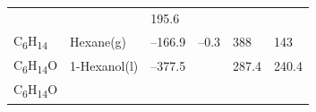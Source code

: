 \documentclass[
  9pt,
]{extbook}
\theoremstyle{definition}
\theoremstyle{definition}
\theoremstyle{definition}
\theoremstyle{remark}
\begin{document}
\begin{longtable}[]{@{}llllll@{}}
\begin{minipage}[t]{0.15\columnwidth}
\strut
\end{minipage} & \begin{minipage}[t]{0.14\columnwidth}\raggedright
\strut
\end{minipage} & \begin{minipage}[t]{0.14\columnwidth}\raggedright
195.6\strut
\end{minipage}\tabularnewline
\begin{minipage}[t]{0.07\columnwidth}\raggedright
C\textsubscript{6}H\textsubscript{14}\strut
\end{minipage} & \begin{minipage}[t]{0.17\columnwidth}\raggedright
Hexane(g)\strut
\end{minipage} & \begin{minipage}[t]{0.15\columnwidth}\raggedright
--166.9\strut
\end{minipage} & \begin{minipage}[t]{0.15\columnwidth}\raggedright
--0.3\strut
\end{minipage} & \begin{minipage}[t]{0.14\columnwidth}\raggedright
388\strut
\end{minipage} & \begin{minipage}[t]{0.14\columnwidth}\raggedright
143\strut
\end{minipage}\tabularnewline
\begin{minipage}[t]{0.07\columnwidth}\raggedright
C\textsubscript{6}H\textsubscript{14}O\strut
\end{minipage} & \begin{minipage}[t]{0.17\columnwidth}\raggedright
1-Hexanol(l)\strut
\end{minipage} & \begin{minipage}[t]{0.15\columnwidth}\raggedright
--377.5\strut
\end{minipage} & \begin{minipage}[t]{0.15\columnwidth}\raggedright
\strut
\end{minipage} & \begin{minipage}[t]{0.14\columnwidth}\raggedright
287.4\strut
\end{minipage} & \begin{minipage}[t]{0.14\columnwidth}\raggedright
240.4\strut
\end{minipage}\tabularnewline
\begin{minipage}[t]{0.07\columnwidth}\raggedright
C\textsubscript{6}H\textsubscript{14}O\strut
\end{minipage} & \begin{minipage}[t]{0.17\columnwidth}\raggedright

\end{minipage}
\end{longtable}
\end{document}
